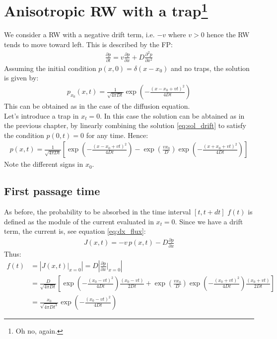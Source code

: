 \documentclass[4apaper,11pt,fleqn]{article}
\theoremstyle{remark}
\theoremstyle{definition}
\begin{document}
\section[Anisotropic RW with a trap]{Anisotropic RW with a trap\footnote{Oh no, again.}}
We consider a RW with a negative drift term, i.e. $-v $ where $v>0$ hence the RW tends to move toward left. This is described by the FP:
\begin{align*}
  \frac{\partial p}{\partial t}=v \frac{\partial p}{\partial x}+D \frac{\partial^{2} p}{\partial x^{2}}
\end{align*}
Assuming the initial condition $p(x,0)=\delta (x-x_0)$  and no traps, the solution is given by:
\begin{align}
  \label{eq:sol_drift}
  p_{x_{0}}(x, t)=\frac{1}{\sqrt{4 \pi D t}} \exp \left(-\frac{\left(x-x_{0}+v t\right)^{2}}{4 D t}\right)
\end{align}
This can be obtained as in the case of the diffusion equation.\\
Let's introduce a trap in $x_t=0$. In this case the solution  can be abtained as in the previous chapter, by linearly combining the solution \eqref{eq:sol_drift} to satisfy the condition $p(0,t)=0$ for any time.
Hence:
\begin{align*}
  p(x, t)=\frac{1}{\sqrt{4 \pi D t}}\left[\exp \left(-\frac{\left(x-x_{0}+v t\right)^{2}}{4 D t}\right)-\exp \left(\frac{v x_{0}}{D}\right) \exp \left(-\frac{\left(x+x_{0}+v t\right)^{2}}{4 D t}\right)\right]
\end{align*}
Note the different signs in $x_0$.


\subsection{First passage time}
As before, the probability to be absorbed in the time interval $[t,t+dt]$ $f(t)$ is defined as the module of the current evaluated in $x_t=0$. Since we have a drift term, the current is, see equation \eqref{eq:dx_flux}:
\begin{align*}
  J(x,t) = -v\, p(x,t) -D \frac{\partial p}{\partial x}
\end{align*}
Thus:
\begin{align*}
  f (t) &= \left|  J(x,t) \Bigr|_{x=0} \right| = D \left| \frac{\partial p}{\partial x} \Bigr|_{x=0} \right| \\
        &= \frac{D}{\sqrt{4 \pi D t}}\left[\exp \left(-\frac{\left(x_{0}-v t\right)^{2}}{4 D t}\right) \frac{\left(x_{0}-v t\right)}{2 D t}+ \exp \left(\frac{v x_{0}}{D}\right) \exp \left(-\frac{\left(x_{0}+v t\right)^{2}}{4 D t}\right) \frac{\left(x_{0}+v t\right)}{2 D t}\right] \\
        &= \frac{x_{0}}{\sqrt{4 \pi D t^{3}}} \exp \left(-\frac{\left(x_{0}-v t\right)^{2}}{4 D t}\right)
\end{align*}
\end{document}
